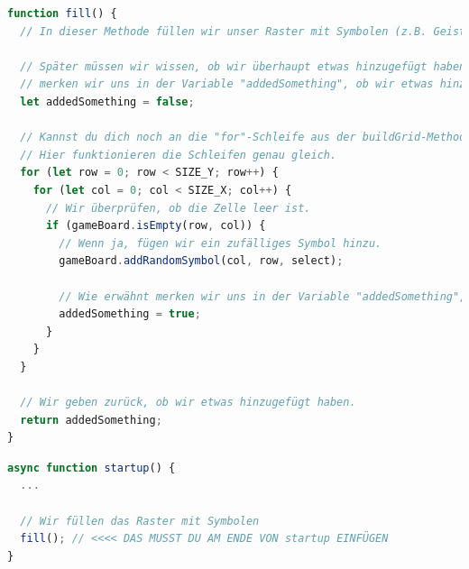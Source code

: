 \documentclass{article}
\begin{document}
    \begin{lstlisting}[language=JavaScript]
function fill() {
  // In dieser Methode füllen wir unser Raster mit Symbolen (z.B. Geister, Kürbis, Süßigkeiten, etc.).

  // Später müssen wir wissen, ob wir überhaupt etwas hinzugefügt haben. Deshalb
  // merken wir uns in der Variable "addedSomething", ob wir etwas hinzugefügt haben.
  let addedSomething = false;

  // Kannst du dich noch an die "for"-Schleife aus der buildGrid-Methode erinnern?
  // Hier funktionieren die Schleifen genau gleich.
  for (let row = 0; row < SIZE_Y; row++) {
    for (let col = 0; col < SIZE_X; col++) {
      // Wir überprüfen, ob die Zelle leer ist.
      if (gameBoard.isEmpty(row, col)) {
        // Wenn ja, fügen wir ein zufälliges Symbol hinzu.
        gameBoard.addRandomSymbol(col, row, select);

        // Wie erwähnt merken wir uns in der Variable "addedSomething", dass wir etwas hinzugefügt haben.
        addedSomething = true;
      }
    }
  }

  // Wir geben zurück, ob wir etwas hinzugefügt haben.
  return addedSomething;
}
    \end{lstlisting}

    \vspace{0.5cm}


    \begin{lstlisting}[language=JavaScript]
async function startup() {
  ...

  // Wir füllen das Raster mit Symbolen
  fill(); // <<<< DAS MUSST DU AM ENDE VON startup EINFÜGEN
}    \end{lstlisting}


    \newpage


\end{document}
